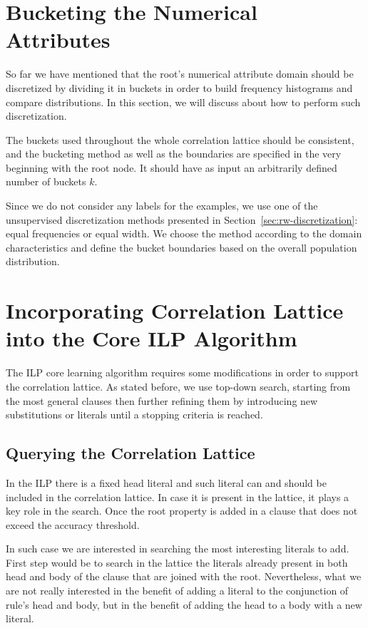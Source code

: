 \section{Bucketing the Numerical Attributes}

So far we have mentioned that the root's numerical attribute domain should be discretized by dividing it in buckets in
order to build frequency histograms and compare distributions. In this section, we will discuss about how to perform
such discretization.

The buckets used throughout the whole correlation lattice should be consistent, and the bucketing method as well as
the
boundaries are specified in the very beginning with the root node. It should have as input an arbitrarily defined
number
of buckets $k$.

Since we do not consider any labels for the examples, we use one of the unsupervised discretization methods presented
in Section~\ref{sec:rw-discretization}: equal frequencies or equal width. We choose the method according to the domain
characteristics and define the bucket boundaries based on the overall population distribution.

\section{Incorporating Correlation Lattice into the Core ILP Algorithm}
\label{sec:incorporation}

The ILP core learning algorithm requires some modifications in order to support the correlation lattice. As stated
before, we use top-down search, starting from the most general clauses then further refining them by introducing
new substitutions or literals until a stopping criteria is reached.

\subsection{Querying the Correlation Lattice}

In the ILP there is a fixed head literal and such literal can and should be included in the correlation lattice. In
case it is present in the lattice, it plays a key role in the search. Once the root property is added in a clause that
does not exceed the accuracy threshold.

In such case we are interested in searching the most interesting literals to add. First step would be to search in the
lattice the literals already present in both head and body of the clause that are joined with the root. Nevertheless,
what we are not really interested in the benefit of adding a literal to the conjunction of rule's head and body, but
in
the benefit of adding the head to a body with a new literal.

